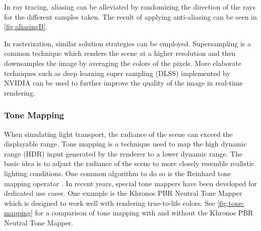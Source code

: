 In ray tracing, aliasing can be alleviated by randomizing the direction of the rays for the different samples taken. The result of applying anti-aliasing can be seen in \autoref{fig:aliasingB}.

In rasterization, similar solution strategies can be employed. Supersampling is a common technique which renders the scene at a higher resolution and then downsamples the image by averaging the colors of the pixels. More elaborate techniques such as deep learning super sampling (DLSS) implemented by NVIDIA \cite{nvidiaDlss} can be used to further improve the quality of the image in real-time rendering.

\subsubsection{Tone Mapping}
\label{sec:toneMappingTheory}

When simulating light transport, the radiance of the scene can exceed the displayable range. Tone mapping is a technique used to map the high dynamic range (\gls{HDR}) input generated by the renderer to a lower dynamic range. The basic idea is to adjust the radiance of the scene to more closely resemble realistic lighting conditions. One common algorithm to do so is the Reinhard tone mapping operator \cite{reinhardToneMapping}. In recent years, special tone mappers have been developed for dedicated use cases. One example is the Khronos PBR Neutral Tone Mapper \cite{pbrNeutralToneMapping} which is designed to work well with rendering true-to-life colors. See \autoref{fig:tone-mapping} for a comparison of tone mapping with and without the Khronos PBR Neutral Tone Mapper.

